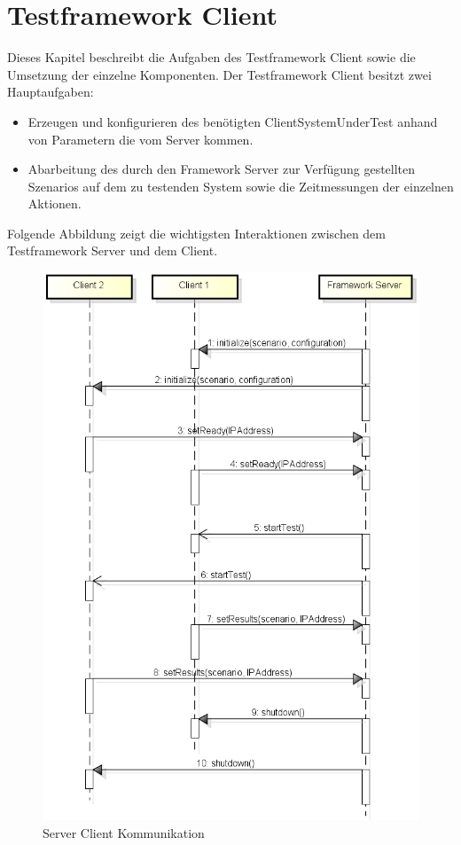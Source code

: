 \section{Testframework Client}
\label{sec:test-FW Client}
Dieses Kapi\-tel beschreibt die Aufgaben des Testframework Client sowie die Umsetzung der einzelne Komponenten. Der Testframework Client besitzt zwei Hauptaufgaben:
\begin{itemize}
\item Erzeugen und konfigurieren des benötigten ClientSystemUnderTest anhand von Parametern die vom Server kommen.
\item Abarbeitung des durch den Framework Server zur Verfügung gestellten Szenarios auf dem zu testenden System sowie die Zeitmessungen der einzelnen Aktionen.
\end{itemize}
Folgende Abbildung zeigt die wichtigsten Interaktionen zwischen dem Test\-framework Server und dem Client.
\begin{figure}[H]
\begin{center}
\includegraphics[scale=0.6]{image_testFramework/Server_Client_Communication.png}
\end{center}
\caption{Server Client Kommunikation}
\end{figure}

